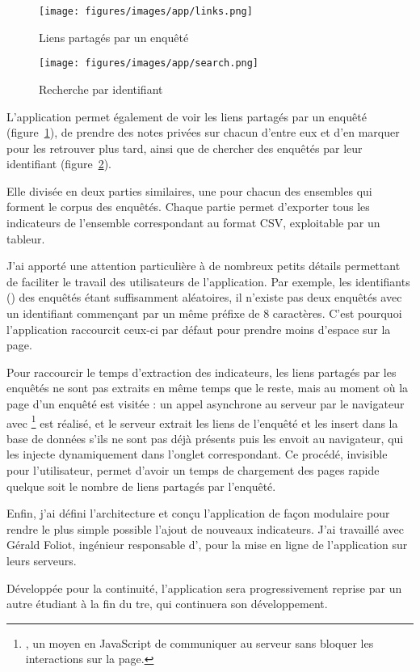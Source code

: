\setlength{\abovecaptionskip}{0pt}
\begin{figure}[ht]
    \begin{center}
        \texttt{[image: figures/images/app/links.png]}
    \end{center}
    \caption{\label{app:links}Liens partagés par un enquêté}
\end{figure}

\begin{figure}[ht]
    \begin{center}
        \texttt{[image: figures/images/app/search.png]}
    \end{center}
    \caption{\label{app:search}Recherche par identifiant}
\end{figure}
\setlength{\abovecaptionskip}{10pt}

L’application permet également de voir les liens partagés par un enquêté
(figure~\ref{app:links}), de prendre des notes privées sur chacun d’entre eux
et d’en marquer pour les retrouver plus tard, ainsi que de chercher des
enquêtés par leur identifiant (figure~\ref{app:search}).

Elle divisée en deux parties similaires, une pour chacun des ensembles qui
forment le corpus des enquêtés. Chaque partie permet d’exporter tous les
indicateurs de l’ensemble correspondant au format CSV, exploitable par un
tableur.

J’ai apporté une attention particulière à de nombreux petits détails permettant
de faciliter le travail des utilisateurs de l’application. Par exemple, les
identifiants () des enquêtés étant suffisamment aléatoires, il
n’existe pas deux enquêtés avec un identifiant commençant par un même préfixe
de 8 caractères. C’est pourquoi l’application raccourcit ceux-ci par défaut
pour prendre moins d’espace sur la page.

Pour raccourcir le temps d’extraction des indicateurs, les liens partagés par
les enquêtés ne sont pas extraits en même temps que le reste, mais au moment où
la page d’un enquêté est visitée : un appel asynchrone au serveur par le
navigateur avec \footnote{, un moyen en JavaScript de communiquer au serveur sans bloquer les
interactions sur la page.} est réalisé, et le serveur extrait les liens de
l’enquêté et les insert dans la base de données s’ils ne sont pas déjà présents
puis les envoit au navigateur, qui les injecte dynamiquement dans l’onglet
correspondant. Ce procédé, invisible pour l’utilisateur, permet d’avoir un
temps de chargement des pages rapide quelque soit le nombre de liens partagés
par l’enquêté.

Enfin, j’ai défini l’architecture et conçu l’application de façon modulaire
pour rendre le plus simple possible l’ajout de nouveaux indicateurs. J’ai
travaillé avec Gérald Foliot, ingénieur responsable d’\humanum{}, pour la mise
en ligne de l’application sur leurs serveurs.

Développée pour la continuité, l’application sera progressivement reprise par
un autre étudiant à la fin du {\sc tre}, qui continuera son développement.
